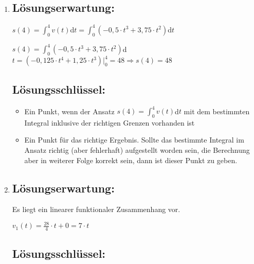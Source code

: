 \begin{langesbeispiel}
{\begin{enumerate}
	Auch die Berechnung über den Differenzenquotienten mit korrektem Grenzwertübergang ist zulässig. 	
	\subsection{Lösungsschlüssel:}
	\begin{itemize}
		\item  Ein Ausgleichspunkt, wenn $a(t)$ als 1. Ableitung der Geschwindigkeitsfunktion korrekt bestimmt wurde.
		\item  Ein Punkt für die korrekte Berechnung des Ergebnisses. Sollte $a(t)$ im Ansatz richtig (aber fehlerhaft) aufgestellt worden sein, die Berechnung aber in weiterer Folge korrekt sein, dann ist dieser Punkt zu geben.
	\end{itemize}
	
	\item \subsection{Lösungserwartung:}
		$s(4)=\int^4_0{v(t)}$d$t=\int^4_0{(-0,5\cdot t^3+3,75\cdot t^2)}$d$t$
		
		$s(4)=\int^4_0{(-0,5\cdot t^3+3,75\cdot t^2)}$d$t=(-0,125\cdot t^4+1,25\cdot t^3)\big|^4_0=48\Rightarrow s(4)=48$
		
	\subsection{Lösungsschlüssel:}
	
\begin{itemize}
	\item Ein Punkt, wenn der Ansatz $s(4)=\int^4_0{v(t)}$d$t$ mit dem bestimmten Integral inklusive der richtigen Grenzen vorhanden ist
	\item  Ein Punkt für das richtige Ergebnis. Sollte das bestimmte Integral im Ansatz richtig (aber fehlerhaft) aufgestellt worden sein, die Berechnung aber in weiterer Folge korrekt sein, dann ist dieser Punkt zu geben.
\end{itemize}
	\item \subsection{Lösungserwartung:}
		Es liegt ein linearer funktionaler Zusammenhang vor.
		
		$v_1(t)=\frac{28}{4}\cdot t+0=7\cdot t$
		
	\subsection{Lösungsschlüssel:}
	

\end{enumerate}}
\end{langesbeispiel}
